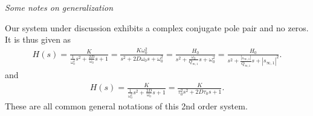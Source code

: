 \begin{mdframed}
\textit{Some notes on generalization}


Our system under discussion exhibits a complex conjugate pole pair and no zeros.
It is thus given as
\begin{align}
H(s) =
\frac{K}{\frac{1}{\omega_0^2} s^2 + \frac{2 D}{\omega_0} s + 1}=
\frac{K \omega_0^2}{s^2 + 2 D \omega_0 s + \omega_0^2} =
\frac{H_0}{s^2 + \frac{\omega_0}{Q_{\infty,1}} s + \omega_0^2} =
\frac{H_0}{s^2 + \frac{|s_{\infty,1}|}{Q_{\infty,1}} s + |s_{\infty,1}|^2}.
\end{align}
and
\begin{align}
\label{eq:Hs_general}
H(s) = \frac{K}{\frac{1}{\omega_0^2} s^2 + \frac{2 D}{\omega_0} s + 1}
= \frac{K}{\tau_0^2 s^2 + 2 D \tau_0 s + 1}.
\end{align}
These are all common general notations of this 2nd order system.


\end{mdframed}
